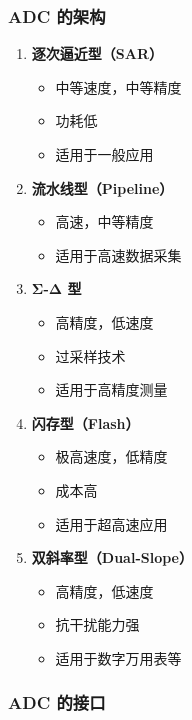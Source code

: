 \subsubsection{ADC 的架构}

\begin{enumerate}
  \item \textbf{逐次逼近型（SAR）}
    \begin{itemize}
      \item 中等速度，中等精度
      \item 功耗低
      \item 适用于一般应用
    \end{itemize}

  \item \textbf{流水线型（Pipeline）}
    \begin{itemize}
      \item 高速，中等精度
      \item 适用于高速数据采集
    \end{itemize}

  \item \textbf{Σ-Δ 型}
    \begin{itemize}
      \item 高精度，低速度
      \item 过采样技术
      \item 适用于高精度测量
    \end{itemize}

  \item \textbf{闪存型（Flash）}
    \begin{itemize}
      \item 极高速度，低精度
      \item 成本高
      \item 适用于超高速应用
    \end{itemize}

  \item \textbf{双斜率型（Dual-Slope）}
    \begin{itemize}
      \item 高精度，低速度
      \item 抗干扰能力强
      \item 适用于数字万用表等
    \end{itemize}
\end{enumerate}

\subsubsection{ADC 的接口}

